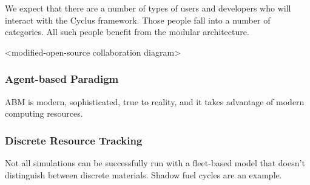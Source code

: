 We expect that there are a number of types of users and developers who will 
interact with the Cyclus framework. Those people fall into a number of 
categories. All such people benefit from the modular architecture. 

<modified-open-source collaboration diagram>

\subsubsection{Agent-based Paradigm}

ABM is modern, sophisticated, true to reality, and it takes advantage of modern 
computing resources. 


\subsubsection{Discrete Resource Tracking}

Not all simulations can be successfully run with a fleet-based model that 
doesn't distinguish between discrete materials. Shadow fuel cycles are an 
example. 

